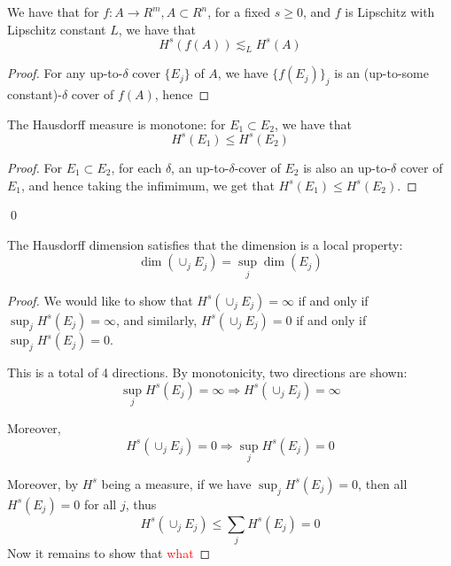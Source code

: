 \begin{exercise}
    We have that for $f: A\to R^m, A\subset R^n$, for a fixed $s\geq 0$, and $f$ is Lipschitz with Lipschitz constant $L$, we have that 
    \begin{equation*}
        H^s(f(A))\lesssim_LH^s(A)
    \end{equation*}
\end{exercise}
\begin{proof}
    For any up-to-$\delta$ cover $\{E_j\}$ of $A$, we have $\{f(E_j)\}_j$ is an (up-to-some constant)-$\delta$ cover of $f(A)$, hence 
\end{proof}

\begin{proposition}
    The Hausdorff measure is monotone: for $E_1\subset E_2$, we have that
    \begin{equation*}
        H^s(E_1)\leq H^s(E_2)
    \end{equation*}
\end{proposition}
\begin{proof}
    For $E_1\subset E_2$, for each $\delta$,  an up-to-$\delta$-cover of $E_2$ is also an up-to-$\delta$ cover of $E_1$, and hence taking the infimimum, we get that $H^s(E_1)\leq H^s(E_2)$.
\end{proof}
\qed


\begin{proposition}
    The Hausdorff dimension satisfies that the dimension is a local property:
    \begin{equation*}
        \dim(\cup_jE_j)=\sup_j\dim(E_j)
    \end{equation*}
\end{proposition}
\begin{proof}
    We would like to show that $H^s(\cup_jE_j)=\infty$ if and only if $\sup_jH^s(E_j)=\infty$, and similarly, $H^s(\cup_jE_j)=0$ if and only if $\sup_jH^s(E_j)=0$.

    This is a total of 4 directions. By monotonicity, two directions are shown:
    \begin{equation*}
        \sup_jH^s(E_j)=\infty \Rightarrow H^s(\cup_jE_j)=\infty
    \end{equation*}

    Moreover,
    \begin{equation*}
        H^s(\cup_jE_j)=0\Rightarrow \sup_jH^s(E_j)=0
    \end{equation*}

    Moreover, by $H^s$ being a measure, if we have $\sup_jH^s(E_j)=0$, then all $H^s(E_j)=0$ for all $j$, thus
    \begin{equation*}
        H^s(\cup_jE_j)\leq\sum_jH^s(E_j)=0
    \end{equation*}
    Now it remains to show that \textcolor{red}{what}

\end{proof}



